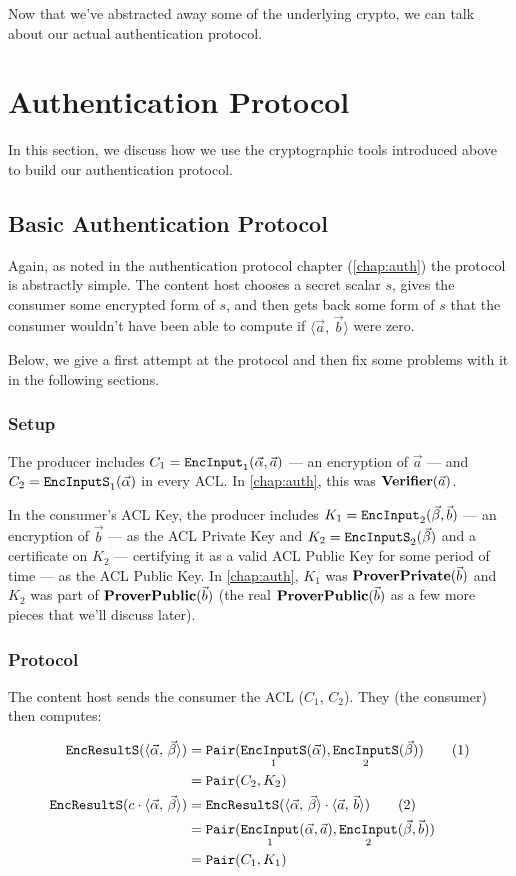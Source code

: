 \documentclass[pdftex,12pt,a4papaer,twoside,notitlepage]{report}
\newcommand{\iprod}[2]{\langle #1,\,#2\rangle}
\DeclareMathOperator{\ein}{\mathtt{EncInput}}
\DeclareMathOperator{\eins}{\mathtt{EncInputS}}
\DeclareMathOperator{\eouts}{\mathtt{EncResultS}}
\DeclareMathOperator{\pair}{\mathtt{Pair}}
\begin{document}
Now that we've abstracted away some of the underlying crypto, we can talk about
our actual authentication protocol.

\section{Authentication Protocol}

In this section, we discuss how we use the cryptographic tools introduced above
to build our authentication protocol.

\subsection{Basic Authentication Protocol}

Again, as noted in the authentication protocol chapter (\cref{chap:auth}) the
protocol is abstractly simple. The content host chooses a secret scalar $s$,
gives the consumer some encrypted form of $s$, and then gets back some form of
$s$ that the consumer wouldn't have been able to compute if
$\iprod{\vec{a}}{\vec{b}}$ were zero.

Below, we give a first attempt at the protocol and then fix some problems with
it in the following sections.

\subsubsection{Setup}

The producer includes $C_1 = \ein_1(\Ap, \vec{a})$ --- an encryption of
$\vec{a}$ --- and $C_2 = \eins_1(\Ap)$ in every ACL. In \cref{chap:auth}, this
was $\operatorname{\mathbf{Verifier}}(\vec{a})$.

In the consumer's ACL Key, the producer includes $K_1 = \ein_2(\Bp, \vec{b})$
--- an encryption of $\vec{b}$ --- as the ACL Private Key and $K_2 =
\eins_2(\Bp)$ and a certificate on $K_2$ --- certifying it as a valid ACL Public
Key for some period of time --- as the ACL Public Key. In \cref{chap:auth},
$K_1$ was $\operatorname{\mathbf{ProverPrivate}}(\vec{b})$ and $K_2$ was part of $\operatorname{\mathbf{ProverPublic}}(\vec{b})$ (the real $\operatorname{\mathbf{ProverPublic}}(\vec{b})$ as a few more pieces
that we'll discuss later).

\subsubsection{Protocol}

The content host sends the consumer the ACL ($C_1$, $C_2$). They (the consumer)
then computes:

\begin{align*}
  \eouts(\ABp)          &= \pair(\eins_1(\Ap), \eins_2(\Bp)) \tag{1} \\
                        &= \pair(C_2, K_2) \\
  \eouts(c \cdot \ABp)  &= \eouts(\ABp \cdot \iprod{\vec{a}}{\vec{b}}) \tag{2} \\
                        &= \pair(\ein_1(\Ap, \vec{a}), \ein_2(\Bp, \vec{b})) \\
                        &= \pair(C_1, K_1) \\
\end{align*}
\end{document}
